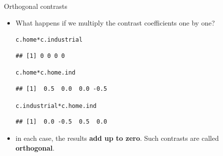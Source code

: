 \documentclass[unknownkeysallowed]{beamer}\usepackage[]{graphicx}\usepackage[]{color}
\makeatletter
\newcommand{\hlopt}[1]{\textcolor[rgb]{0,0,0}{#1}}%
\newcommand{\hlstd}[1]{\textcolor[rgb]{0.345,0.345,0.345}{#1}}%
\newenvironment{kframe}{%
 \def\at@end@of@kframe{}%
 \ifinner\ifhmode%
  \def\at@end@of@kframe{\end{minipage}}%
  \begin{minipage}{\columnwidth}%
 \fi\fi%
 \def\FrameCommand##1{\hskip\@totalleftmargin \hskip-\fboxsep
 \colorbox{shadecolor}{##1}\hskip-\fboxsep
     \hskip-\linewidth \hskip-\@totalleftmargin \hskip\columnwidth}%
 \MakeFramed {\advance\hsize-\width
   \@totalleftmargin\z@ \linewidth\hsize
   \@setminipage}}%
 {\par\unskip\endMakeFramed%
 \at@end@of@kframe}
\newenvironment{knitrout}{}{} %
\makeatother
\begin{document}
\begin{frame}[fragile]{Orthogonal contrasts}
  
  \begin{itemize}
  \item What happens if we multiply the contrast coefficients one by one?
\begin{knitrout}
\color{fgcolor}\begin{kframe}
\begin{alltt}
\hlstd{c.home}\hlopt{*}\hlstd{c.industrial}
\end{alltt}
\begin{verbatim}
## [1] 0 0 0 0
\end{verbatim}
\begin{alltt}
\hlstd{c.home}\hlopt{*}\hlstd{c.home.ind}
\end{alltt}
\begin{verbatim}
## [1]  0.5  0.0  0.0 -0.5
\end{verbatim}
\begin{alltt}
\hlstd{c.industrial}\hlopt{*}\hlstd{c.home.ind}
\end{alltt}
\begin{verbatim}
## [1]  0.0 -0.5  0.5  0.0
\end{verbatim}
\end{kframe}
\end{knitrout}
\item in each case, the results \textbf{add up to zero}. Such
  contrasts are called \textbf{orthogonal}.

  \end{itemize}
  
\end{frame}
\end{document}
